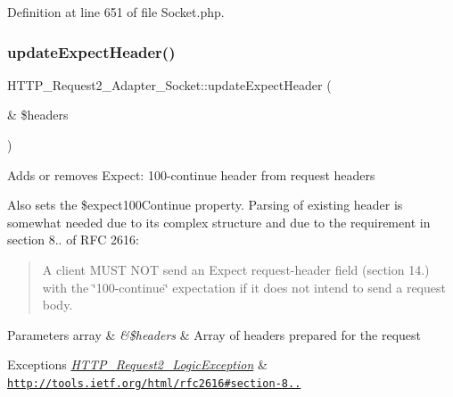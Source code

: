 Definition at line 651 of file Socket.\+php.

\hypertarget{classHTTP__Request2__Adapter__Socket_a7a547941e41ce97677f3217284a0c447}{}\label{classHTTP__Request2__Adapter__Socket_a7a547941e41ce97677f3217284a0c447} 
\subsubsection{\texorpdfstring{update\+Expect\+Header()}{updateExpectHeader()}}
{\footnotesize\ttfamily H\+T\+T\+P\+\_\+\+Request2\+\_\+\+Adapter\+\_\+\+Socket\+::update\+Expect\+Header (\begin{DoxyParamCaption}\item[{\&}]{\$headers }\end{DoxyParamCaption})\hspace{0.3cm}{\ttfamily [protected]}}

Adds or removes \textquotesingle{}Expect\+: 100-\/continue\textquotesingle{} header from request headers

Also sets the \$expect100\+Continue property. Parsing of existing header is somewhat needed due to its complex structure and due to the requirement in section 8.. of R\+FC 2616\+: \begin{quote}
A client M\+U\+ST N\+OT send an Expect request-\/header field (section 14.) with the \char`\"{}100-\/continue\char`\"{} expectation if it does not intend to send a request body. \end{quote}



\begin{DoxyParams}[1]{Parameters}
array & {\em \&\$headers} & Array of headers prepared for the request\\
\hline
\end{DoxyParams}

\begin{DoxyExceptions}{Exceptions}
{\em \hyperlink{classHTTP__Request2__LogicException}{H\+T\+T\+P\+\_\+\+Request2\+\_\+\+Logic\+Exception}} & \hyperlink{}{\href{http://tools.ietf.org/html/rfc2616#section-8.2.3}{\tt http\+://tools.\+ietf.\+org/html/rfc2616\#section-\/8..} }\\
\hline
\end{DoxyExceptions}


